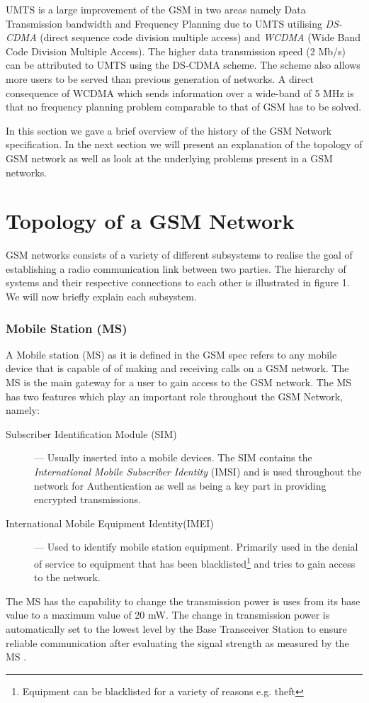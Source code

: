 UMTS is a large improvement of the GSM in two areas namely Data Transmission bandwidth and Frequency Planning due to UMTS utilising \emph{DS-CDMA} (direct sequence code division multiple access) and \emph{WCDMA} (Wide Band Code Division Multiple Access). The higher data transmission speed (2 Mb/s) can be attributed to UMTS using the DS-CDMA scheme. The scheme also allows more users to be served than previous generation of networks. A direct consequence of WCDMA which sends information over a wide-band of 5 MHz is that no frequency planning problem comparable to that of GSM has to be solved\cite{tabuglobalplanning3g,Eisenblatter}.

In this section we gave a brief overview of the history of the GSM Network specification. In the next section we will present an explanation of the topology of GSM network as well as look at the 
underlying problems present in a GSM networks.
\section{Topology of a GSM Network}
GSM networks consists of a variety of different subsystems to realise the goal of establishing a radio communication link between two parties. The hierarchy of systems and their respective connections to
each other is illustrated in figure 1. We will now briefly explain each subsystem.
\subsubsection{Mobile Station (MS)}
A Mobile station (MS) as it is defined in the GSM spec refers to any mobile device that is capable of of making and receiving calls on a GSM network.  The MS is the main gateway 
for a user to gain access to the GSM network. The MS has two features which play an important role throughout the GSM Network, namely:
\begin{description}
\item[Subscriber Identification Module (SIM)] --- Usually inserted into a mobile devices. The SIM contains the \emph{International Mobile Subscriber Identity} (IMSI) and is used throughout the network 
for Authentication as well as being a key part in providing encrypted transmissions.
\item[International Mobile Equipment Identity(IMEI)] --- Used to identify mobile station equipment. Primarily used in the denial of service to equipment that has been blacklisted\footnote{Equipment can be blacklisted for a variety of reasons e.g. theft} and tries to gain access to the network.
\end{description}
The MS has the capability to change the transmission power is uses from its base value to a maximum value of 20 mW. The change in transmission power is automatically set to the lowest level by the Base Transceiver Station to ensure reliable communication after evaluating the signal strength as measured by the MS \cite{GSMSysEngin}. %

